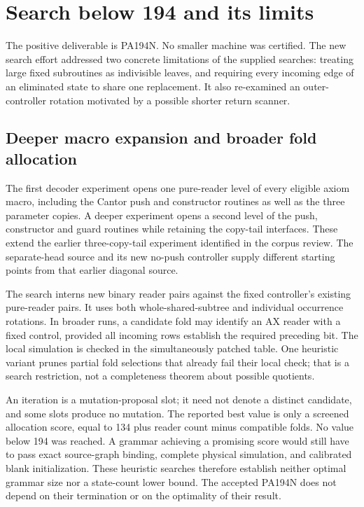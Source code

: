 \section{Search below 194 and its limits}
\label{sec:search}

The positive deliverable is PA194N. No smaller machine was certified.
The new search effort addressed two concrete limitations of the supplied
searches: treating large fixed subroutines as indivisible leaves, and
requiring every incoming edge of an eliminated state to share one replacement.
It also re-examined an outer-controller rotation motivated by a possible
shorter return scanner.

\subsection{Deeper macro expansion and broader fold allocation}

The first decoder experiment opens one pure-reader level of every eligible
axiom macro, including the Cantor push and constructor routines as well as
the three parameter copies. A deeper experiment opens a second level of
the push, constructor and guard routines while retaining the copy-tail
interfaces. These extend the earlier three-copy-tail experiment identified
in the corpus review. The separate-head source and its new no-push controller
supply different starting points from that earlier diagonal source.

The search interns new binary reader pairs against the fixed controller's
existing pure-reader pairs. It uses both whole-shared-subtree and individual
occurrence rotations. In broader runs, a candidate fold may identify an AX
reader with a fixed control, provided all incoming rows establish the
required preceding bit. The local simulation is checked in the simultaneously
patched table. One heuristic variant prunes partial fold selections that
already fail their local check; that is a search restriction, not a completeness
theorem about possible quotients.



An iteration is a mutation-proposal slot; it need not denote a distinct
candidate, and some slots produce no mutation. The reported best value is
only a screened allocation score, equal to 134 plus reader count minus
compatible folds. No value below 194 was reached. A grammar achieving a
promising score would still have to pass exact source-graph binding,
complete physical simulation, and calibrated blank initialization. These
heuristic searches therefore establish neither optimal grammar size nor
a state-count lower bound. The accepted PA194N does not depend on their
termination or on the optimality of their result.

